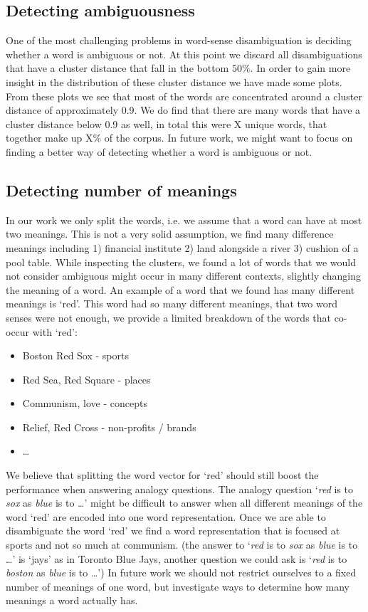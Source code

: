 \documentclass[11pt]{article}
\begin{document}
\subsection{Detecting ambiguousness}
One of the most challenging problems in word-sense disambiguation is deciding whether a word is ambiguous or not. At this point we discard all disambiguations that have a cluster distance that fall in the bottom $50\%$. In order to gain more insight in the distribution of these cluster distance we have made some plots. From these plots we see that most of the words are concentrated around a cluster distance of approximately 0.9. We do find that there are many words that have a cluster distance below 0.9 as well, in total this were X unique words, that together make up X$\%$ of the corpus. In future work, we might want to focus on finding a better way of detecting whether a word is ambiguous or not. 
\subsection{Detecting number of meanings}
In our work we only split the words, i.e. we assume that a word can have at most two meanings. This is not a very solid assumption, we find many difference meanings including 1) financial institute 2) land alongside a river 3) cushion of a pool table. While inspecting the clusters, we found a lot of words that we would not consider ambiguous might occur in many different contexts, slightly changing the meaning of a word. An example of a word that we found has many different meanings is `red'. This word had so many different meanings, that two word senses were not enough, we provide a limited breakdown of the words that co-occur with `red':
\begin{itemize}
\item Boston Red Sox - sports
\item Red Sea, Red Square - places
\item Communism, love - concepts
\item Relief, Red Cross - non-profits / brands
\item \dots
\end{itemize} 
We believe that splitting the word vector for `red' should still boost the performance when answering analogy questions. The analogy question `\textit{red} is to \textit{sox} as \textit{blue} is to \dots' might be difficult to answer when all different meanings of the word `red' are encoded into one word representation. Once we are able to disambiguate the word `red' we find a word representation that is focused at sports and not so much at communism. (the answer to `\textit{red} is to \textit{sox} as \textit{blue} is to \dots' is `jays' as in Toronto Blue Jays, another question we could ask is `\textit{red} is to \textit{boston} as \textit{blue} is to \dots') In future work we should not restrict ourselves to a fixed number of meanings of one word, but investigate ways to determine how many meanings a word actually has. 
 
\end{document}
